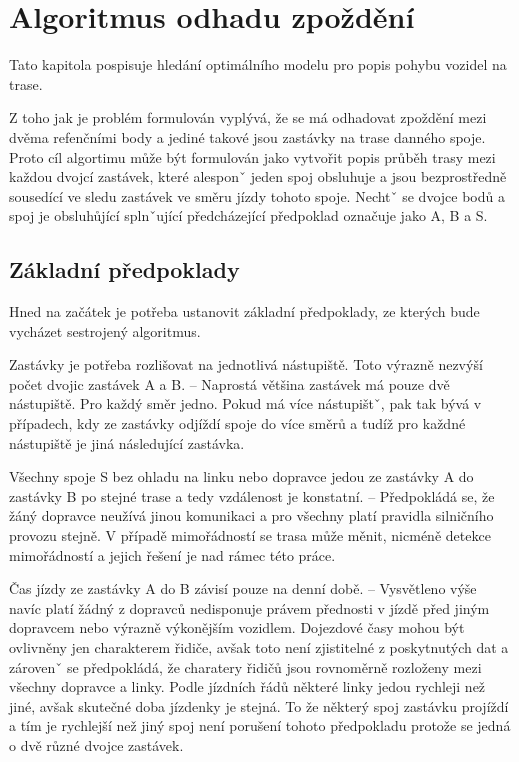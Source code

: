 
\chapter{Algoritmus odhadu zpoždění}

Tato kapitola pospisuje hledání optimálního modelu pro popis pohybu vozidel na trase.

\bigbreak

Z toho jak je problém formulován vyplývá, že se má odhadovat zpoždění mezi dvěma refenčními body a jediné takové jsou zastávky na trase danného spoje. Proto cíl algortimu může být formulován jako vytvořit popis průběh trasy mezi každou dvojcí zastávek, které alesponˇ jeden spoj obsluhuje a jsou bezprostředně sousedící ve sledu zastávek ve směru jízdy tohoto spoje. Nechtˇ se dvojce bodů a spoj je obsluhůjící splnˇující předcházející předpoklad označuje jako A, B a S.

\section{Základní předpoklady}

Hned na začátek je potřeba ustanovit základní předpoklady, ze kterých bude vycházet sestrojený algoritmus.

\bigbreak

Zastávky je potřeba rozlišovat na jednotlivá nástupiště. Toto výrazně nezvýší počet dvojic zastávek A a B. -- Naprostá většina zastávek má pouze dvě nástupiště. Pro každý směr jedno. Pokud má více nástupištˇ, pak tak bývá v případech, kdy ze zastávky odjíždí spoje do  více směrů a tudíž pro každné nástupiště je jiná následující zastávka.

\bigbreak

Všechny spoje S bez ohladu na linku nebo dopravce jedou ze zastávky A do zastávky B po stejné trase a tedy vzdálenost je konstatní. -- Předpokládá se, že žáný dopravce neužívá jinou komunikaci a pro všechny platí pravidla silničního provozu stejně. V případě mimořádností se trasa může měnit, nicméně detekce mimořádností a jejich řešení je nad rámec této práce.

\bigbreak

Čas jízdy ze zastávky A do B závisí pouze na denní době. -- Vysvětleno výše navíc platí žádný z dopravců nedisponuje právem přednosti v jízdě před jiným dopravcem nebo výrazně výkonějším vozidlem.  Dojezdové časy mohou být ovlivněny jen charakterem řidiče, avšak toto není zjistitelné z poskytnutých dat a zárovenˇ se předpokládá, že charatery řidičů jsou rovnoměrně rozloženy mezi všechny dopravce a linky. Podle jízdních řádů některé linky jedou rychleji než jiné, avšak skutečné doba jízdenky je stejná. To že některý spoj zastávku projíždí a tím je rychlejší než jiný spoj není porušení tohoto předpokladu protože se jedná o dvě různé dvojce zastávek.

